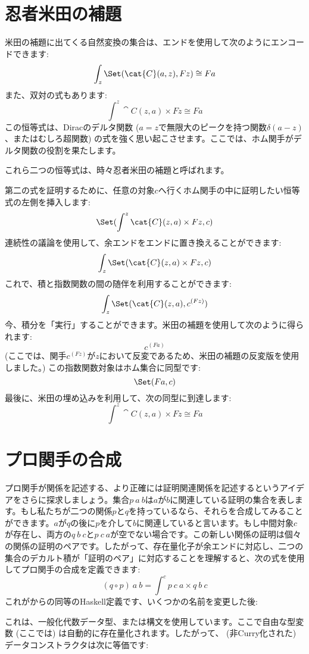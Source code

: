 \section{忍者米田の補題}

米田の補題に出てくる自然変換の集合は、エンドを使用して次のようにエンコードできます: 
\[\int_z \Set(\cat{C}(a, z), F z) \cong F a\]
また、双対の式もあります: 
\[\int^z \cat{C}(z, a)\times{}F z \cong F a\]
この恒等式は、Diracのデルタ関数 ($a = z$で無限大のピークを持つ関数$\delta(a - z)$、またはむしろ超関数) の式を強く思い起こさせます。ここでは、ホム関手がデルタ関数の役割を果たします。

これら二つの恒等式は、時々忍者米田の補題と呼ばれます。

第二の式を証明するために、任意の対象$c$へ行くホム関手の中に証明したい恒等式の左側を挿入します: 
\[\Set(\int^z \cat{C}(z, a)\times{}F z, c)\]
連続性の議論を使用して、余エンドをエンドに置き換えることができます: 
\[\int_z \Set(\cat{C}(z, a)\times{}F z, c)\]
これで、積と指数関数の間の随伴を利用することができます: 
\[\int_z \Set(\cat{C}(z, a), c^{(F z)})\]
今、積分を「実行」することができます。米田の補題を使用して次のように得られます: 
\[c^{(F a)}\]
 (ここでは、関手$c^{(F z)}$が$z$において反変であるため、米田の補題の反変版を使用しました。) 
この指数関数対象はホム集合に同型です: 
\[\Set(F a, c)\]
最後に、米田の埋め込みを利用して、次の同型に到達します: 
\[\int^z \cat{C}(z, a)\times{}F z \cong F a\]

\section{プロ関手の合成}

プロ関手が関係を記述する、より正確には証明関連関係を記述するというアイデアをさらに探求しましょう。集合$p\ a\ b$は$a$が$b$に関連している証明の集合を表します。もし私たちが二つの関係$p$と$q$を持っているなら、それらを合成してみることができます。$a$が$q$の後に$p$を介して$b$に関連していると言います。もし中間対象$c$が存在し、両方の$q\ b\ c$と$p\ c\ a$が空でない場合です。この新しい関係の証明は個々の関係の証明のペアです。したがって、存在量化子が余エンドに対応し、二つの集合のデカルト積が「証明のペア」に対応することを理解すると、次の式を使用してプロ関手の合成を定義できます: 
\[(q \circ p)\ a\ b = \int^c p\ c\ a\times{}q\ b\ c\]
これがからの同等のHaskell定義です、いくつかの名前を変更した後: 

これは、一般化代数データ型、または構文を使用しています。ここで自由な型変数 (ここでは) は自動的に存在量化されます。したがって、 (非Curry化された) データコンストラクタは次に等価です: 

